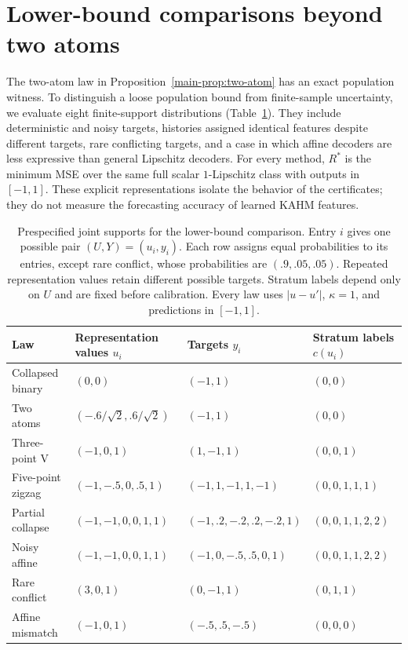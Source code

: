 \section{Lower-bound comparisons beyond two atoms}
\label{sec:witness-comparison}

The two-atom law in Proposition~\ref{main-prop:two-atom} has an exact population
witness. To distinguish a loose population bound from finite-sample uncertainty,
we evaluate eight finite-support distributions (Table~\ref{tab:witness-laws}).
They include deterministic and noisy targets, histories assigned identical
features despite different targets, rare conflicting targets, and a case in
which affine decoders are less expressive than general Lipschitz decoders.
For every method, $R^*$ is the minimum MSE over the same full scalar
$1$-Lipschitz class with outputs in $[-1,1]$. These explicit representations
isolate the behavior of the certificates;
they do not measure the forecasting accuracy of learned KAHM features.

\begin{table}[t]
\centering\footnotesize
\setlength{\tabcolsep}{3pt}
\begin{tabular}{llll}
\toprule
Law & Representation values $u_i$ & Targets $y_i$ & Stratum labels $c(u_i)$ \\
\midrule
Collapsed binary & $(0,0)$ & $(-1,1)$ & $(0,0)$ \\
Two atoms & $(-.6/\sqrt2,.6/\sqrt2)$ & $(-1,1)$ & $(0,0)$ \\
Three-point V & $(-1,0,1)$ & $(1,-1,1)$ & $(0,0,1)$ \\
Five-point zigzag & $(-1,-.5,0,.5,1)$ & $(-1,1,-1,1,-1)$ & $(0,0,1,1,1)$ \\
Partial collapse & $(-1,-1,0,0,1,1)$ & $(-1,.2,-.2,.2,-.2,1)$ & $(0,0,1,1,2,2)$ \\
Noisy affine & $(-1,-1,0,0,1,1)$ & $(-1,0,-.5,.5,0,1)$ & $(0,0,1,1,2,2)$ \\
Rare conflict & $(3,0,1)$ & $(0,-1,1)$ & $(0,1,1)$ \\
Affine mismatch & $(-1,0,1)$ & $(-.5,.5,-.5)$ & $(0,0,0)$ \\
\bottomrule
\end{tabular}
\caption{Prespecified joint supports for the lower-bound comparison. Entry $i$ gives one possible pair $(U,Y)=(u_i,y_i)$. Each row assigns equal probabilities to its entries, except rare conflict, whose probabilities are $(.9,.05,.05)$. Repeated representation values retain different possible targets. Stratum labels depend only on $U$ and are fixed before calibration. Every law uses $|u-u'|$, $\kappa=1$, and predictions in $[-1,1]$.}
\label{tab:witness-laws}
\end{table}


